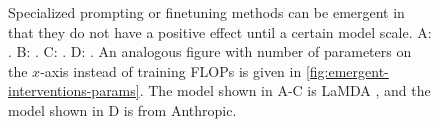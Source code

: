 \begin{figure}[ht]
\begin{centering}
    \caption{
    Specialized prompting or finetuning methods can be emergent in that they do not have a positive effect until a certain model scale.
    A: \citet{wei2022chain}.
    B: \citet{wei2021finetuned}.
    C: \citet{nye2021show}.
    D: \citet{kadavath2022language}.
    An analogous figure with number of parameters on the $x$-axis instead of training FLOPs is given in \cref{fig:emergent-interventions-params}.
    The model shown in A-C is LaMDA \citep{thoppilan2022lamda}, and the model shown in D is from Anthropic.
    } 
    \label{fig:emergent-interventions}
    \end{centering}
\end{figure}